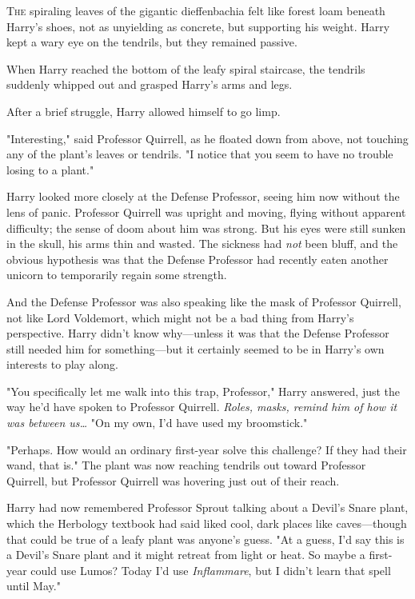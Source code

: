 
\lettrine{T}{he} spiraling 
leaves of the gigantic dieffenbachia felt like forest loam beneath Harry's 
shoes, not as unyielding as concrete, but supporting his weight. Harry kept a 
wary eye on the tendrils, but they remained passive.

When Harry reached the bottom of the leafy spiral staircase, the tendrils 
suddenly whipped out and grasped Harry's arms and legs.

After a brief struggle, Harry allowed himself to go limp.

"Interesting," said Professor Quirrell, as he floated down from above, not 
touching any of the plant's leaves or tendrils. "I notice that you seem to have 
no trouble losing to a plant."

Harry looked more closely at the Defense Professor, seeing him now without the 
lens of panic. Professor Quirrell was upright and moving, flying without 
apparent difficulty; the sense of doom about him was strong. But his eyes were 
still sunken in the skull, his arms thin and wasted. The sickness had 
\emph{not} been bluff, and the obvious hypothesis was that the Defense 
Professor had recently eaten another unicorn to temporarily regain some 
strength.

And the Defense Professor was also speaking like the mask of Professor 
Quirrell, not like Lord Voldemort, which might not be a bad thing from Harry's 
perspective. Harry didn't know why---unless it was that the Defense Professor 
still needed him for something---but it certainly seemed to be in Harry's own 
interests to play along.

"You specifically let me walk into this trap, Professor," Harry answered, just 
the way he'd have spoken to Professor Quirrell. \emph{Roles, masks, remind him 
of how it was between us{\ldots}} "On my own, I'd have used my broomstick."

"Perhaps. How would an ordinary first-year solve this challenge? If they had 
their wand, that is." The plant was now reaching tendrils out toward Professor 
Quirrell, but Professor Quirrell was hovering just out of their reach.

Harry had now remembered Professor Sprout talking about a Devil's Snare plant, 
which the Herbology textbook had said liked cool, dark places like 
caves---though that could be true of a leafy plant was anyone's guess. "At a 
guess, I'd say this is a Devil's Snare plant and it might retreat from light or 
heat. So maybe a first-year could use Lumos? Today I'd use \emph{Inflammare}, 
but I didn't learn that spell until May."

